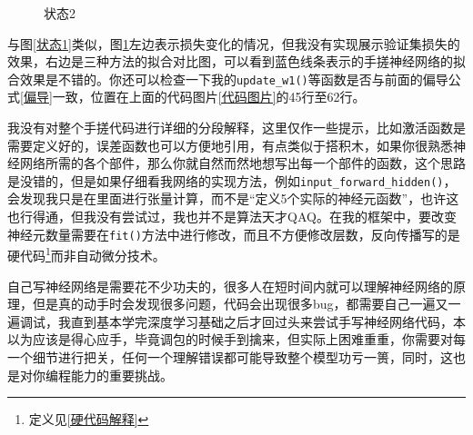 \documentclass[a5paper, 11pt]{ctexbook}
\begin{document}
\begin{figure}[h!]
    \centering
    \caption{状态2} \label{状态2}
\end{figure}

与图\ref{状态1}类似，图\ref{状态2}左边表示损失变化的情况，但我没有实现展示验证集损失的效果，右边是三种方法的拟合对比图，可以看到蓝色线条表示的手搓神经网络的拟合效果是不错的。你还可以检查一下我的\verb|update_w1()|等函数是否与前面的偏导公式\ref{偏导}一致，位置在上面的代码图片\ref{代码图片}的45行至62行。

我没有对整个手搓代码进行详细的分段解释，这里仅作一些提示，比如激活函数是需要定义好的，误差函数也可以方便地引用，有点类似于搭积木，如果你很熟悉神经网络所需的各个部件，那么你就自然而然地想写出每一个部件的函数，这个思路是没错的，但是如果仔细看我网络的实现方法，例如\verb|input_forward_hidden()|，会发现我只是在里面进行张量计算，而不是“定义5个实际的神经元函数”，也许这也行得通，但我没有尝试过，我也并不是算法天才QAQ。在我的框架中，要改变神经元数量需要在\verb|fit()|方法中进行修改，而且不方便修改层数，反向传播写的是硬代码\footnote{定义见\ref{硬代码解释}}而非自动微分技术。

自己写神经网络是需要花不少功夫的，很多人在短时间内就可以理解神经网络的原理，但是真的动手时会发现很多问题，代码会出现很多bug，都需要自己一遍又一遍调试，我直到基本学完深度学习基础之后才回过头来尝试手写神经网络代码，本以为应该是得心应手，毕竟调包的时候手到擒来，但实际上困难重重，你需要对每一个细节进行把关，任何一个理解错误都可能导致整个模型功亏一篑，同时，这也是对你编程能力的重要挑战。
\end{document}
